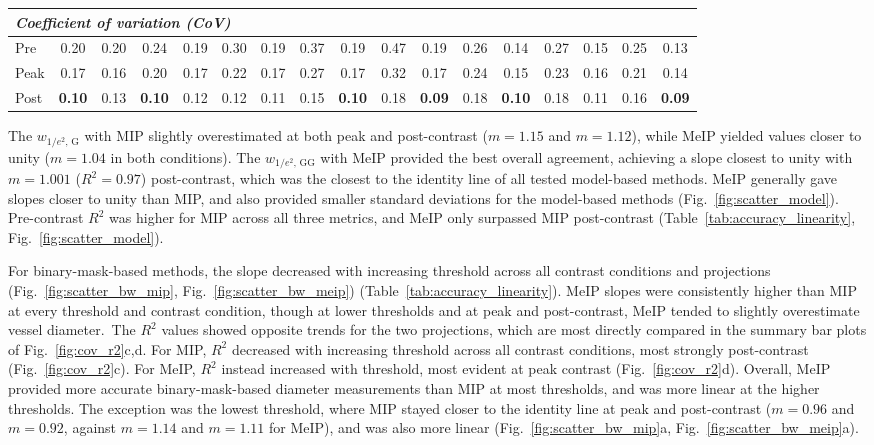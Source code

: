 \begin{table}[p]
{\begin{tabular}{l c c | c c | c c | c c | c c || c c | c c | c c}
\hline
\multicolumn{17}{l}{\textit{Coefficient of variation (CoV)}} \\
\hline
Pre & 0.20 & 0.20 & 0.24 & 0.19 & 0.30 & 0.19 & 0.37 & 0.19 & 0.47 & 0.19 & 0.26 & 0.14 & 0.27 & 0.15 & 0.25 & 0.13 \\
Peak & 0.17 & 0.16 & 0.20 & 0.17 & 0.22 & 0.17 & 0.27 & 0.17 & 0.32 & 0.17 & 0.24 & 0.15 & 0.23 & 0.16 & 0.21 & 0.14 \\
Post & \textbf{0.10} & 0.13 & \textbf{0.10} & 0.12 & 0.12 & 0.11 & 0.15 & \textbf{0.10} & 0.18 & \textbf{0.09} & 0.18 & \textbf{0.10} & 0.18 & 0.11 & 0.16 & \textbf{0.09} \\
\hline
\end{tabular}%
}
\end{table}

The $w_{1/e^2,\,\mathrm{G}}$ with MIP slightly overestimated at both peak and post-contrast ($m = 1.15$ and $m = 1.12$), while MeIP yielded values closer to unity ($m = 1.04$ in both conditions). The $w_{1/e^2,\,\mathrm{GG}}$ with MeIP provided the best overall agreement, achieving a slope closest to unity with $m = 1.001$ ($R^2 = 0.97$) post-contrast, which was the closest to the identity line of all tested model-based methods. MeIP generally gave slopes closer to unity than MIP, and also provided smaller standard deviations for the model-based methods (Fig.~\ref{fig:scatter_model}). Pre-contrast $R^2$ was higher for MIP across all three metrics, and MeIP only surpassed MIP post-contrast (Table~\ref{tab:accuracy_linearity}, Fig.~\ref{fig:scatter_model}).


For binary-mask-based methods, the slope decreased with increasing threshold across all contrast conditions and projections (Fig.~\ref{fig:scatter_bw_mip}, Fig.~\ref{fig:scatter_bw_meip}) (Table~\ref{tab:accuracy_linearity}). MeIP slopes were consistently higher than MIP at every threshold and contrast condition, though at lower thresholds and at peak and post-contrast, MeIP tended to slightly overestimate vessel diameter.~The $R^2$ values showed opposite trends for the two projections, which are most directly compared in the summary bar plots of Fig.~\ref{fig:cov_r2}c,d. For MIP, $R^2$ decreased with increasing threshold across all contrast conditions, most strongly post-contrast (Fig.~\ref{fig:cov_r2}c). For MeIP, $R^2$ instead increased with threshold, most evident at peak contrast (Fig.~\ref{fig:cov_r2}d). Overall, MeIP provided more accurate binary-mask-based diameter measurements than MIP at most thresholds, and was more linear at the higher thresholds. The exception was the lowest threshold, where MIP stayed closer to the identity line at peak and post-contrast ($m = 0.96$ and $m = 0.92$, against $m = 1.14$ and $m = 1.11$ for MeIP), and was also more linear (Fig.~\ref{fig:scatter_bw_mip}a, Fig.~\ref{fig:scatter_bw_meip}a).


